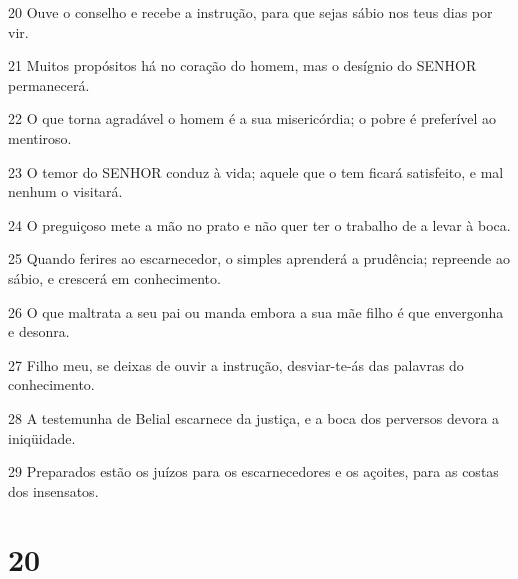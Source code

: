 \par 20 Ouve o conselho e recebe a instrução, para que sejas sábio nos teus dias por vir.
\par 21 Muitos propósitos há no coração do homem, mas o desígnio do SENHOR permanecerá.
\par 22 O que torna agradável o homem é a sua misericórdia; o pobre é preferível ao mentiroso.
\par 23 O temor do SENHOR conduz à vida; aquele que o tem ficará satisfeito, e mal nenhum o visitará.
\par 24 O preguiçoso mete a mão no prato e não quer ter o trabalho de a levar à boca.
\par 25 Quando ferires ao escarnecedor, o simples aprenderá a prudência; repreende ao sábio, e crescerá em conhecimento.
\par 26 O que maltrata a seu pai ou manda embora a sua mãe filho é que envergonha e desonra.
\par 27 Filho meu, se deixas de ouvir a instrução, desviar-te-ás das palavras do conhecimento.
\par 28 A testemunha de Belial escarnece da justiça, e a boca dos perversos devora a iniqüidade.
\par 29 Preparados estão os juízos para os escarnecedores e os açoites, para as costas dos insensatos.

\chapter{20}

